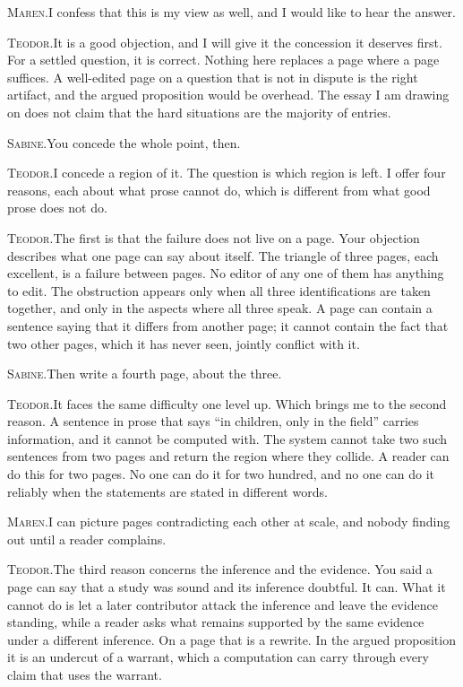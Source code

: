 \documentclass[11pt]{article}
\newcommand{\say}[2]{\par\noindent\textsc{#1.}\enspace #2\par}
\newcommand{\MA}[1]{\say{Maren}{#1}}
\newcommand{\TE}[1]{\say{Teodor}{#1}}
\newcommand{\SA}[1]{\say{Sabine}{#1}}
\begin{document}
\MA{I confess that this is my view as well, and I would like to hear the answer.}

\TE{It is a good objection, and I will give it the concession it deserves first. For a settled question, it is correct. Nothing here replaces a page where a page suffices. A well-edited page on a question that is not in dispute is the right artifact, and the argued proposition would be overhead. The essay I am drawing on does not claim that the hard situations are the majority of entries.}

\SA{You concede the whole point, then.}

\TE{I concede a region of it. The question is which region is left. I offer four reasons, each about what prose cannot do, which is different from what good prose does not do.}

\TE{The first is that the failure does not live on a page. Your objection describes what one page can say about itself. The triangle of three pages, each excellent, is a failure between pages. No editor of any one of them has anything to edit. The obstruction appears only when all three identifications are taken together, and only in the aspects where all three speak. A page can contain a sentence saying that it differs from another page; it cannot contain the fact that two other pages, which it has never seen, jointly conflict with it.}

\SA{Then write a fourth page, about the three.}

\TE{It faces the same difficulty one level up. Which brings me to the second reason. A sentence in prose that says ``in children, only in the field'' carries information, and it cannot be computed with. The system cannot take two such sentences from two pages and return the region where they collide. A reader can do this for two pages. No one can do it for two hundred, and no one can do it reliably when the statements are stated in different words.}

\MA{I can picture pages contradicting each other at scale, and nobody finding out until a reader complains.}

\TE{The third reason concerns the inference and the evidence. You said a page can say that a study was sound and its inference doubtful. It can. What it cannot do is let a later contributor attack the inference and leave the evidence standing, while a reader asks what remains supported by the same evidence under a different inference. On a page that is a rewrite. In the argued proposition it is an undercut of a warrant, which a computation can carry through every claim that uses the warrant.}
\end{document}
